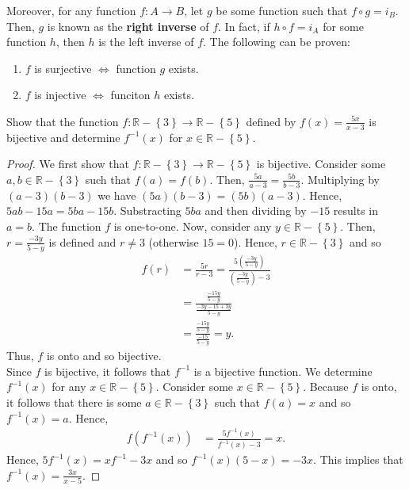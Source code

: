 \documentclass[12pt]{article}
\newcommand{\R}{\mathbb{R}}
\newenvironment{problem}[2][Problem]{\begin{trivlist} \item[\hskip \labelsep {\bfseries #1}\hskip \labelsep {\bfseries #2.}]}{\end{trivlist}}
\begin{document}
    Moreover, for any function $f:A\to B$, let $g$ be some function such that $f\circ g = i_{B}$. Then, $g$ is known as the \textbf{right inverse} of $f$. In fact, if $h\circ f= i_{A}$ for some function $h$, then $h$ is the left inverse of $f$. The following can be proven: 
    \begin{enumerate}
      \item $f$ is surjective $\iff$ function $g$ exists.
      \item $f$ is injective $\iff$ funciton $h$ exists.
    \end{enumerate}
    \begin{problem}{51}
      Show that the function $f:\R-\left\{ 3 \right\}\to \R-\left\{ 5 \right\}$ defined by $f(x) = \frac{5x}{x-3}$ is bijective and determine $f^{-1}(x)$ for $x\in \R-\left\{ 5 \right\}$.
    \begin{proof}
      We first show that $f:\R-\left\{ 3 \right\} \to \R-\left\{ 5 \right\}$ is bijective. Consider some $a,b\in \R-\left\{ 3 \right\}$ such that $f(a)=f(b)$. Then, $\frac{5a}{a-3}=\frac{5b}{b-3}$. Multiplying by $(a-3)(b-3)$ we have $(5a)(b-3) = (5b)(a-3)$. Hence, $5ab-15a = 5ba-15b$. Substracting $5ba$ and then dividing by $-15$ results in $a=b$. The function $f$ is one-to-one. Now, consider any $y\in \R-\left\{ 5 \right\}$. Then, $r=\frac{-3y}{5-y}$ is defined and $r\neq 3$ (otherwise $15=0$). Hence, $r\in \R-\left\{ 3 \right\}$ and so
    \begin{align*}
      f(r) &= \frac{5r}{r-3} = \frac{5\left( \frac{-3y}{5-y} \right)}{\left( \frac{-3y}{5-y} \right)-3}\\
      &= \frac{\frac{-15y}{5-y}}{\frac{-3y-15+3y}{5-y}} \\
      &= \frac{\frac{-15y}{5-y}}{\frac{-15}{5-y}}= y.
    \end{align*}
    Thus, $f$ is onto and so bijective. \\
    Since $f$ is bijective, it follows that $f^{-1}$ is a bijective function. We determine $f^{-1}(x)$ for any $x\in \R-\left\{ 5 \right\}$. Consider some $x\in \R-\left\{ 5 \right\}$. Because $f$ is onto, it follows that there is some $a\in \R-\left\{ 3 \right\}$ such that $f(a)=x$ and so $f^{-1}(x) = a$. Hence,
    \begin{align*}
      f\left( f^{-1}(x) \right) &= \frac{5f^{-1}(x)}{f^{-1}(x)-3} = x.
    \end{align*}
    Hence, $5f^{-1}(x) = xf^{-1}-3x$ and so $f^{-1}(x)(5-x) = -3x$. This implies that $f^{-1}(x) = \frac{3x}{x-5}$.
    \end{proof}
    \end{problem}
\end{document}
